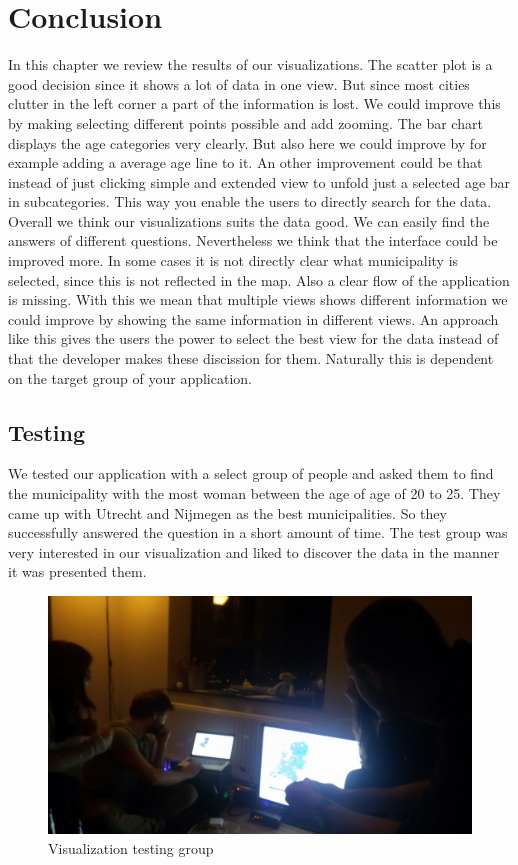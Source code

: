 \documentclass[a4paper,twoside,11pt]{article}
\begin{document}
\section{Conclusion}
In this chapter we review the results of our visualizations. \newline
The scatter plot is a good decision since it shows a lot of data in one view. But since most cities clutter in the left corner a part of the information is lost. We could improve this by making selecting different points possible and add zooming. \newline
The bar chart displays the age categories very clearly. But also here we could improve by for example adding a average age line to it. An other improvement could be that instead of just clicking simple and extended view to unfold just a selected age bar in subcategories. This way you enable the users to directly search for the data. \newline
Overall we think our visualizations suits the data good. We can easily find the answers of different questions. Nevertheless we think that the interface could be improved more. In some cases it is not directly clear what municipality is selected, since this is not reflected in the map. Also a clear flow of the application is missing. With this we mean that multiple views shows different information we could improve by showing the same information in different views. An approach like this gives the users the power to select the best view for the data instead of that the developer makes these discission for them. Naturally this is dependent on the target group of your application.

\subsection{Testing}
We tested our application with a select group of people and asked them to find the municipality with the most woman between the age of age of 20 to 25. They came up with Utrecht and Nijmegen as the best municipalities. So they successfully answered the question in a short amount of time. The test group was very interested in our visualization and liked to discover the data in the manner it was presented them.

\begin{figure}[h]
        \centering
        \includegraphics[width=\textwidth]{Conclusion/Conclusion1.jpg}
        \caption{Visualization testing group}
        \label{fig:numberOfInhabitants}
\end{figure}
\end{document}
